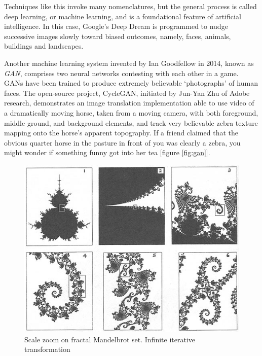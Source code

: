 \documentclass{UIdahoMastersThesis}
\begin{document}
Techniques like this invoke many nomenclatures, but the general process is called deep learning, or machine learning, and is a foundational feature of artificial intelligence. In this case, Google's Deep Dream is programmed to nudge successive images slowly toward biased outcomes, namely, faces, animals, buildings and landscapes. 

Another machine learning system invented by Ian Goodfellow in 2014, known as \textit{\ac{GAN}}, comprises two neural networks contesting with each other in a game. \acp{GAN} have been trained to produce extremely believable `photographs' of human faces. The open-source project, CycleGAN, initiated by Jun-Yan Zhu of Adobe research, demonstrates an image translation implementation able to use video of a dramatically moving horse, taken from a moving camera, with both foreground, middle ground, and background elements, and track very believable zebra texture mapping onto the horse's apparent topography. If a friend claimed that the obvious quarter horse in the pasture in front of you was clearly a zebra, you might wonder if something funny got into her tea [figure \ref{fig:gan}].

\newpage
\begin{figure}[h!]
	\centering
	\includegraphics[width=.81\linewidth]{mandel.png}
	\caption{Scale zoom on fractal Mandelbrot set. Infinite iterative transformation}
	\label{fig:mandel}
\end{figure}
\end{document}
